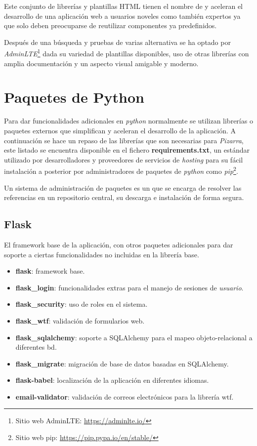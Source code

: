 \documentclass[11pt,spanish,listoffigures,listoftables]{tfgetsinf}
\begin{document}
Este conjunto de librerías y plantillas HTML tienen el nombre de  y aceleran el desarrollo de una aplicación web a usuarios noveles como también expertos ya que solo deben preocuparse de reutilizar componentes ya predefinidos.

Después de una búsqueda y pruebas de varias alternativa se ha optado por \textit{AdminLTE}\footnote{Sitio web AdminLTE: \url{https://adminlte.io/}} dada su variedad de plantillas disponibles, uso de otras librerías con amplia documentación y un aspecto visual amigable y moderno.

\section{Paquetes de Python}

Para dar funcionalidades adicionales en \textit{python} normalmente se utilizan librerías o \Gls{paquete}s externos que simplifican y aceleran el desarrollo de la aplicación. A continuación se hace un repaso de las librerías que son necesarias para \textit{Pizarra}, este listado se encuentra disponible en el fichero \textbf{requirements.txt}, un estándar utilizado por desarrolladores y proveedores de servicios de \textit{hosting} \cite{book-developing-web-python} para su fácil instalación a posterior por administradores de paquetes de \textit{python} como \textit{pip}\footnote{Sitio web pip: \url{https://pip.pypa.io/en/stable/}}.

Un sistema de administración de paquetes es un  que se encarga de resolver las referencias en un repositorio central, su descarga e instalación de forma segura.

\subsection{Flask}

El framework base de la aplicación, con otros \Gls{paquete}s adicionales para dar soporte a ciertas funcionalidades no incluidas en la librería base.

\begin{itemize}
	\item \textbf{flask}: framework base.
	\item \textbf{flask\_login}: funcionalidades extras para el manejo de sesiones de \textit{usuario}.
	\item \textbf{flask\_security}: uso de roles en el sistema.
	\item \textbf{flask\_wtf}: validación de formularios web.
	\item \textbf{flask\_sqlalchemy}: soporte a SQLAlchemy para el mapeo objeto-relacional a diferentes \acrshort{bd}.
	\item \textbf{flask\_migrate}: migración de base de datos basadas en SQLAlchemy.
	\item \textbf{flask-babel}: localización de la aplicación en diferentes idiomas.
	\item \textbf{email-validator}: validación de correos electrónicos para la librería wtf.
\end{itemize}
\end{document}
